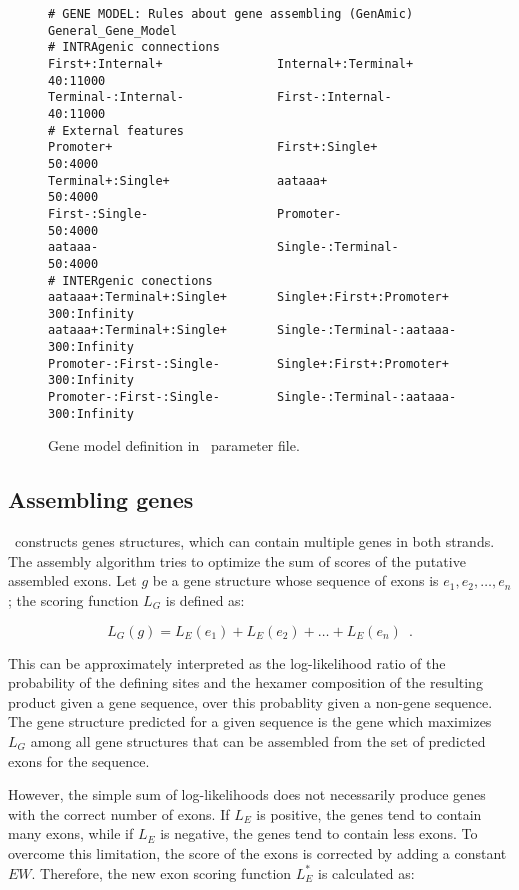 \begin{figure}
\footnotesize{
\begin{verbatim}
# GENE MODEL: Rules about gene assembling (GenAmic)
General_Gene_Model
# INTRAgenic connections
First+:Internal+                Internal+:Terminal+             40:11000 
Terminal-:Internal-             First-:Internal-                40:11000 
# External features
Promoter+                       First+:Single+                  50:4000
Terminal+:Single+               aataaa+                         50:4000
First-:Single-                  Promoter-                       50:4000
aataaa-                         Single-:Terminal-               50:4000
# INTERgenic conections
aataaa+:Terminal+:Single+       Single+:First+:Promoter+        300:Infinity
aataaa+:Terminal+:Single+       Single-:Terminal-:aataaa-       300:Infinity
Promoter-:First-:Single-        Single+:First+:Promoter+        300:Infinity
Promoter-:First-:Single-        Single-:Terminal-:aataaa-       300:Infinity
\end{verbatim}}
\caption{Gene model definition in \geneid\ parameter file.} \label{gene model}
\end{figure}

\subsection{Assembling genes}

\geneid\ constructs genes structures, which can contain multiple genes
in both strands. The assembly algorithm tries to optimize the sum of
scores of the putative assembled exons. Let $g$ be a gene structure
whose sequence of exons is $e_1, e_2, \ldots, e_n$; the scoring
function $L_G$ is defined as:

\begin{equation}
L_G(g) = L_E(e_1) + L_E(e_2) + \ldots + L_E(e_n)\,\,\,. 
\end{equation}

This can be approximately interpreted as the log-likelihood ratio of
the probability of the defining sites and the hexamer composition of
the resulting product given a gene sequence, over this probablity
given a non-gene sequence. The gene structure predicted for a given
sequence is the gene which maximizes $L_G$ among all gene structures
that can be assembled from the set of predicted exons for the
sequence.

However, the simple sum of log-likelihoods does not necessarily
produce genes with the correct number of exons. If $L_E$ is positive,
the genes tend to contain many exons, while if $L_E$ is negative, the
genes tend to contain less exons. To overcome this limitation, the
score of the exons is corrected by adding a constant $EW$. Therefore,
the new exon scoring function $L_E^*$ is calculated as:

